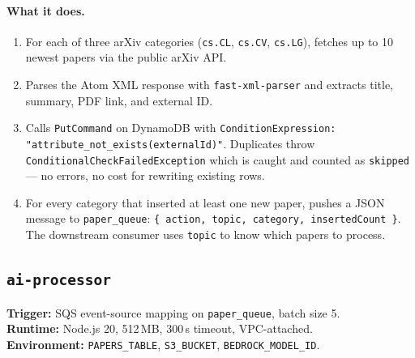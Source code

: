 \documentclass[11pt,a4paper]{article}
\begin{document}
\paragraph{What it does.}
\begin{enumerate}[leftmargin=*]
  \item For each of three arXiv categories (\texttt{cs.CL}, \texttt{cs.CV}, \texttt{cs.LG}), fetches up to 10 newest papers via the public arXiv API.
  \item Parses the Atom XML response with \texttt{fast-xml-parser} and extracts title, summary, PDF link, and external ID.
  \item Calls \texttt{PutCommand} on DynamoDB with \texttt{ConditionExpression: "attribute\_not\_exists(externalId)"}. Duplicates throw \texttt{ConditionalCheckFailedException} which is caught and counted as \texttt{skipped} --- no errors, no cost for rewriting existing rows.
  \item For every category that inserted at least one new paper, pushes a JSON message to \texttt{paper\_queue}: \texttt{\{ action, topic, category, insertedCount \}}. The downstream consumer uses \texttt{topic} to know which papers to process.
\end{enumerate}

\subsection{\texttt{ai-processor}}

\textbf{Trigger:} SQS event-source mapping on \texttt{paper\_queue}, batch size 5. \\
\textbf{Runtime:} Node.js 20, 512\,MB, 300\,s timeout, VPC-attached. \\
\textbf{Environment:} \texttt{PAPERS\_TABLE}, \texttt{S3\_BUCKET}, \texttt{BEDROCK\_MODEL\_ID}.
\end{document}
